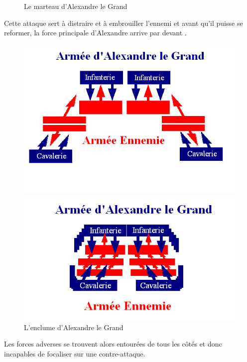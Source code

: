 \documentclass{article}
\begin{document}
\begin{center}
\begin{figure}[H]
\hfill
\caption{Le \og{}marteau\fg{} d'Alexandre le Grand}
\end{figure}
Cette attaque sert à distraire et à embrouiller l'ennemi et avant qu'il puisse se reformer, la force principale d'Alexandre arrive par devant \cite{Alexanders_tactics}.
\begin{figure}[H]
\hfill
\begin{minipage}[H]{0.5\linewidth}
	\centering
	\includegraphics[width=\linewidth]{../ressources/enclume}
\end{minipage}
\hfill
\begin{minipage}[H]{0.45\linewidth}
	\centering
	\includegraphics[width=\linewidth]{../ressources/enclume2}
\end{minipage}
\hfill
\caption{\og{}L'enclume\fg{} d'Alexandre le Grand \cite{Alexanders_tactics}}
\end{figure}
\cite{Alexanders_tactics}
\end{center}
Les forces adverses se trouvent alors entourées de tous les côtés et donc incapables de focaliser sur une contre-attaque.
\end{document}
